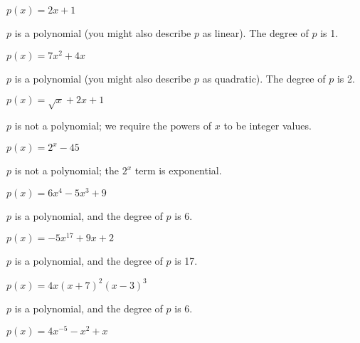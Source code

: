 \begin{exercises}
\begin{problem}
 	\begin{multicols}{3}
 		\begin{subproblem}
 			$p(x)=2x+1$
 			\begin{shortsolution}
 				$p$ is a polynomial (you might also describe $p$ as linear). The degree of $p$ is 1.
 			\end{shortsolution}
 		\end{subproblem}
 		\begin{subproblem}
 			$p(x)=7x^2+4x$
 			\begin{shortsolution}
 				$p$ is a polynomial (you might also describe $p$ as quadratic). The degree of $p$ is 2.
 			\end{shortsolution}
 		\end{subproblem}
 		\begin{subproblem}
 			$p(x)=\sqrt{x}+2x+1$
 			\begin{shortsolution}
 				$p$ is not a polynomial; we require the powers of $x$ to be integer values.
 			\end{shortsolution}
 		\end{subproblem}
 		\begin{subproblem}
 			$p(x)=2^x-45$
 			\begin{shortsolution}
 				$p$ is not a polynomial; the $2^x$ term is exponential.
 			\end{shortsolution}
 		\end{subproblem}
 		\begin{subproblem}
 			$p(x)=6x^4-5x^3+9$
 			\begin{shortsolution}
 				$p$ is a polynomial, and the degree of $p$ is $6$.
 			\end{shortsolution}
 		\end{subproblem}
 		\begin{subproblem}
 			$p(x)=-5x^{17}+9x+2$
 			\begin{shortsolution}
 				$p$ is a polynomial, and the degree of $p$ is 17.
 			\end{shortsolution}
 		\end{subproblem}
 		\begin{subproblem}
 			$p(x)=4x(x+7)^2(x-3)^3$
 			\begin{shortsolution}
 				$p$ is a polynomial, and the degree of $p$ is $6$.
 			\end{shortsolution}
 		\end{subproblem}
 		\begin{subproblem}
 			$p(x)=4x^{-5}-x^2+x$
 			\begin{shortsolution}

\end{shortsolution}
\end{subproblem}
\end{multicols}
\end{problem}
\end{exercises}
